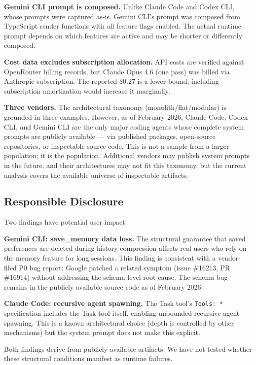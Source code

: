 \textbf{Gemini CLI prompt is composed.} Unlike Claude Code and Codex
CLI, whose prompts were captured as-is, Gemini CLI's prompt was composed
from TypeScript render functions with all feature flags enabled. The
actual runtime prompt depends on which features are active and may be
shorter or differently composed.

\textbf{Cost data excludes subscription allocation.} API costs are
verified against OpenRouter billing records, but Claude Opus 4.6 (one
pass) was billed via Anthropic subscription. The reported \$0.27 is a
lower bound; including subscription amortization would increase it
marginally.

\textbf{Three vendors.} The architectural taxonomy
(monolith/flat/modular) is grounded in three examples. However, as of
February 2026, Claude Code, Codex CLI, and Gemini CLI are the only
major coding agents whose complete system prompts are publicly available
--- via published packages, open-source repositories, or inspectable
source code. This is not a sample from a larger population; it is the
population. Additional vendors may publish system prompts in the future,
and their architectures may not fit this taxonomy, but the current
analysis covers the available universe of inspectable artifacts.

\subsection{Responsible Disclosure}

Two findings have potential user impact:

\textbf{Gemini CLI: save\_memory data loss.} The structural guarantee
that saved preferences are deleted during history compression affects
real users who rely on the memory feature for long sessions. This
finding is consistent with a vendor-filed P0 bug report: Google patched
a related symptom (issue \#16213, PR \#16914) without addressing the
schema-level root cause. The schema bug remains in the publicly
available source code as of February 2026.

\textbf{Claude Code: recursive agent spawning.} The Task tool's
\texttt{Tools:\ *} specification includes the Task tool itself, enabling
unbounded recursive agent spawning. This is a known architectural choice
(depth is controlled by other mechanisms) but the system prompt does not
make this explicit.

Both findings derive from publicly available artifacts. We have not
tested whether these structural conditions manifest as runtime failures.

